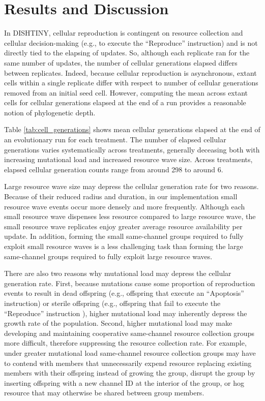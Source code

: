\section{Results and Discussion}

In DISHTINY, cellular reproduction is contingent on resource collection and cellular decision-making (e.g., to execute the ``Reproduce'' instruction) and is not directly tied to the elapsing of updates.
So, although each replicate ran for the same number of updates, the number of cellular generations elapsed differs between replicates.
Indeed, because cellular reproduction is asynchronous, extant cells within a single replicate differ with respect to number of cellular generations removed from an initial seed cell.
However, computing the mean across extant cells for cellular generations elapsed at the end of a run provides a reasonable notion of phylogenetic depth.



Table \ref{tab:cell_generations} shows mean cellular generations elapsed at the end of an evolutionary run for each treatment.
The number of elapsed cellular generations varies systematically across treatments, generally deceasing both with increasing mutational load and increased resource wave size.
Across treatments, elapsed cellular generation counts range from around 298 to around 6.

Large resource wave size may depress the cellular generation rate for two reasons.
Because of their reduced radius and duration, in our implementation small resource wave events occur more densely and more frequently.
Although each small resource wave dispenses less resource compared to large resource wave, the small resource wave replicates enjoy greater average resource availability per update.
In addition, forming the small same-channel groups required to fully exploit small resource waves is a less challenging task than forming the large same-channel groups required to fully exploit large resource waves.

There are also two reasons why mutational load may depress the cellular generation rate.
First, because mutations cause some proportion of reproduction events to result in dead offspring (e.g., offspring that execute an ``Apoptosis'' instruction) or sterile offspring (e.g., offspring that fail to execute the ``Reproduce'' instruction ), higher mutational load may inherently depress the growth rate of the population.
Second, higher mutational load may make developing and maintaining cooperative same-channel resource collection groups more difficult, therefore suppressing the resource collection rate.
For example, under greater mutational load same-channel resource collection groups may have to contend with members that unnecessarily expend resource replacing existing members with their offspring instead of growing the group, disrupt the group by inserting offspring with a new channel ID at the interior of the group, or hog resource that may otherwise be shared between group members.

